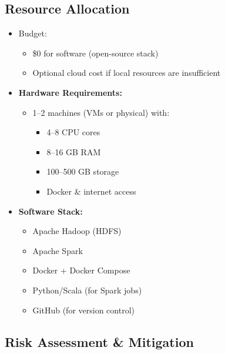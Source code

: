 \documentclass[conference]{IEEEtran}
\begin{document}
\subsection{Resource Allocation}
\begin{itemize}
    \item Budget:
    \begin{itemize}
        \item \$0 for software (open-source stack)
        \item Optional cloud cost if local resources are insufficient
    \end{itemize}
    
    \item \textbf{Hardware Requirements:}
    \begin{itemize}
        \item 1--2 machines (VMs or physical) with:
        \begin{itemize}
            \item 4--8 CPU cores
            \item 8--16 GB RAM
            \item 100--500 GB storage
            \item Docker \& internet access
        \end{itemize}
    \end{itemize}
    
    \item \textbf{Software Stack:}
    \begin{itemize}
        \item Apache Hadoop (HDFS)
        \item Apache Spark
        \item Docker + Docker Compose
        \item Python/Scala (for Spark jobs)
        \item GitHub (for version control)
    \end{itemize}
\end{itemize}

\subsection{Risk Assessment \& Mitigation}
\end{document}
